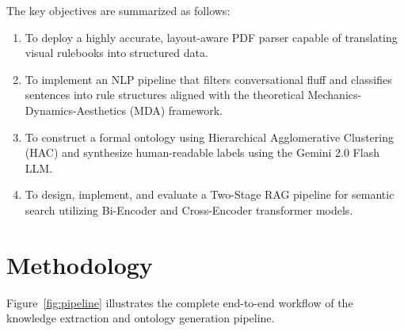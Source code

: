 \documentclass{article}
\begin{document}
The key objectives are summarized as follows:
\begin{enumerate}[noitemsep]
    \item To deploy a highly accurate, layout-aware PDF parser capable of translating visual rulebooks into structured data.
    \item To implement an NLP pipeline that filters conversational fluff and classifies sentences into rule structures aligned with the theoretical Mechanics-Dynamics-Aesthetics (MDA) framework.
    \item To construct a formal ontology using Hierarchical Agglomerative Clustering (HAC) and synthesize human-readable labels using the Gemini 2.0 Flash LLM.
    \item To design, implement, and evaluate a Two-Stage RAG pipeline for semantic search utilizing Bi-Encoder and Cross-Encoder transformer models.
\end{enumerate}

\section{Methodology}
\label{sec:methodology}

Figure~\ref{fig:pipeline} illustrates the complete end-to-end workflow of the knowledge extraction and ontology generation pipeline.
\end{document}
